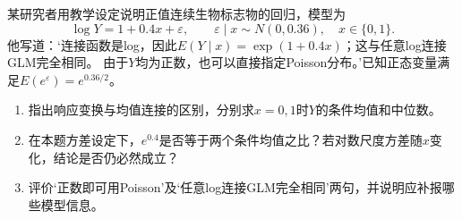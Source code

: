 某研究者用教学设定说明正值连续生物标志物的回归，模型为
\[\log Y=1+0.4x+\varepsilon,\qquad\varepsilon\mid x\sim N(0,0.36),\quad x\in\{0,1\}.\]
他写道：‘连接函数是log，因此$E(Y\mid x)=\exp(1+0.4x)$；这与任意log连接GLM完全相同。
由于$Y$均为正数，也可以直接指定Poisson分布。’已知正态变量满足$E(e^\varepsilon)=e^{0.36/2}$。
\begin{enumerate}
\item 指出响应变换与均值连接的区别，分别求$x=0,1$时$Y$的条件均值和中位数。
\item 在本题方差设定下，$e^{0.4}$是否等于两个条件均值之比？若对数尺度方差随$x$变化，结论是否仍必然成立？
\item 评价‘正数即可用Poisson’及‘任意log连接GLM完全相同’两句，并说明应补报哪些模型信息。
\end{enumerate}
